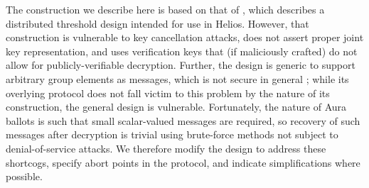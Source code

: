 \documentclass{article}
\begin{document}
The construction we describe here is based on that of \cite{cortier}, which describes a distributed threshold design intended for use in Helios.
However, that construction is vulnerable to key cancellation attacks, does not assert proper joint key representation, and uses verification keys that (if maliciously crafted) do not allow for publicly-verifiable decryption.
Further, the design is generic to support arbitrary group elements as messages, which is not secure in general \cite{boneh}; while its overlying protocol does not fall victim to this problem by the nature of its construction, the general design is vulnerable.
Fortunately, the nature of Aura ballots is such that small scalar-valued messages are required, so recovery of such messages after decryption is trivial using brute-force methods not subject to denial-of-service attacks.
We therefore modify the design to address these shortcogs, specify abort points in the protocol, and indicate simplifications where possible.
\end{document}
